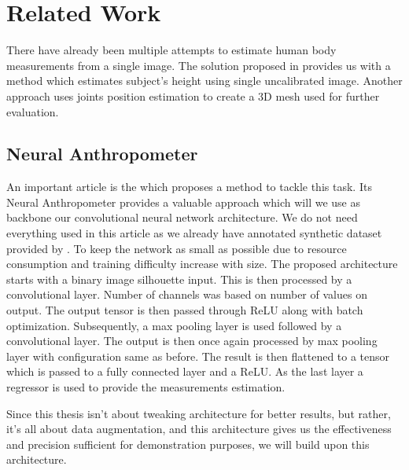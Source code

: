 \chapter{Related Work}
There have already been multiple attempts to estimate human body measurements from a single image.  The solution proposed in \cite{HBDE1} provides us with a method which estimates subject's height using single uncalibrated image. Another approach  \cite{KeepItSMPL} uses joints position estimation to create a 3D mesh used for further evaluation.

\section{Neural Anthropometer}
An important article is the \cite{source} which proposes a method to tackle this task. Its Neural Anthropometer provides a valuable approach which will we use as backbone our convolutional neural network architecture. We do not need everything used in this article as we already have annotated synthetic dataset provided by \cite{super}. To keep the network as small as possible due to resource consumption and training difficulty increase with size. The proposed architecture starts with a binary image silhouette input. This is then processed by a convolutional layer. Number of channels was based on number of values on output. The output tensor is then passed through ReLU \cite{relu} along with batch optimization. Subsequently, a max pooling layer is used followed by a  convolutional layer. The output is then once again processed by max pooling layer with configuration same as before.  The result is then flattened to a tensor which is passed to a fully connected layer and a ReLU. As the last layer a regressor is used to provide the measurements estimation.

Since this thesis isn't about tweaking architecture for better results, but rather, it's all about data augmentation, and this architecture gives us the effectiveness and precision sufficient for demonstration purposes, we will build  upon this architecture.
